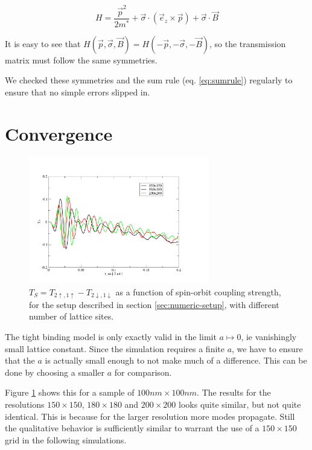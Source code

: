 \begin{equation}
H = \frac{\vec{p}^2}{2 m^*} + \vec \sigma \cdot (\vec e_z \times \vec p)  
    + \vec \sigma \cdot \vec B
\end{equation}

It is easy to see that $H(\vec p, \vec \sigma, \vec B) = H(-\vec p,
-\vec \sigma, -\vec B)$, so the transmission matrix must follow the
same symmetries.

We checked these symmetries and the sum rule (eq. \ref{eq:sumrule}) regularly
to ensure that no simple errors slipped in.

\section{Convergence}
\begin{figure}
    \begin{center}
        \includegraphics[angle=270,width=0.7\textwidth]{convergence.pdf}
    \end{center}
    \caption{$T_S = T_{2\uparrow,1\uparrow}-T_{2\downarrow,1\downarrow}$ as a
        function of spin-orbit coupling strength, for the setup described in
        section \ref{sec:numeric-setup}, with different number of lattice
        sites.}
    \label{fig:convergence}
\end{figure}

The tight binding model is only exactly valid in the limit $ a \mapsto 0$, ie
vanishingly small lattice constant. Since the simulation requires a finite
$a$, we have to ensure that the $a$ is actually small enough to not make much
of a difference. This can be done by choosing a smaller $a$ for comparison.

Figure \ref{fig:convergence} shows this for a sample of $100nm \times 100nm$.
The results for the resolutions $150 \times 150$, $180 \times 180$ and $200
\times 200$ looks quite similar, but not quite identical. This is because for
the larger resolution more modes propagate. Still the qualitative behavior is
sufficiently similar to warrant the use of a $150 \times 150$ grid in the
following simulations.

